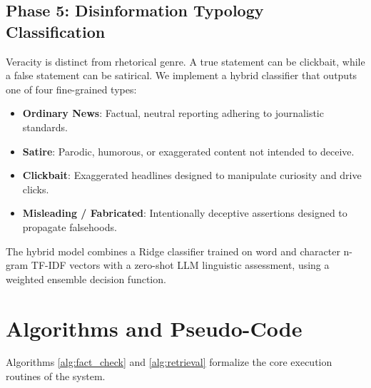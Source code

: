 \documentclass[12pt,a4paper]{report}
\begin{document}
\subsection{Phase 5: Disinformation Typology Classification}
Veracity is distinct from rhetorical genre. A true statement can be clickbait, while a false statement can be satirical. We implement a hybrid classifier that outputs one of four fine-grained types:
\begin{itemize}
    \item \textbf{Ordinary News}: Factual, neutral reporting adhering to journalistic standards.
    \item \textbf{Satire}: Parodic, humorous, or exaggerated content not intended to deceive.
    \item \textbf{Clickbait}: Exaggerated headlines designed to manipulate curiosity and drive clicks.
    \item \textbf{Misleading / Fabricated}: Intentionally deceptive assertions designed to propagate falsehoods.
\end{itemize}
The hybrid model combines a Ridge classifier trained on word and character n-gram TF-IDF vectors with a zero-shot LLM linguistic assessment, using a weighted ensemble decision function.

\section{Algorithms and Pseudo-Code}
Algorithms \ref{alg:fact_check} and \ref{alg:retrieval} formalize the core execution routines of the system.
\end{document}
